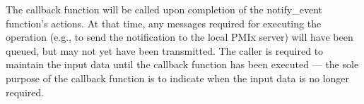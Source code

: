 \adviceuserstart
The callback function will be called upon completion of the
notify_event function's actions. At that time, any messages required for executing the operation (e.g., to send the notification to the local \ac{PMIx} server) will
have been queued, but may not yet have been transmitted. The caller is required to maintain the input
data until the callback function has been executed --- the sole purpose of the callback function is to indicate when the input data is no longer required.
\adviceuserend


